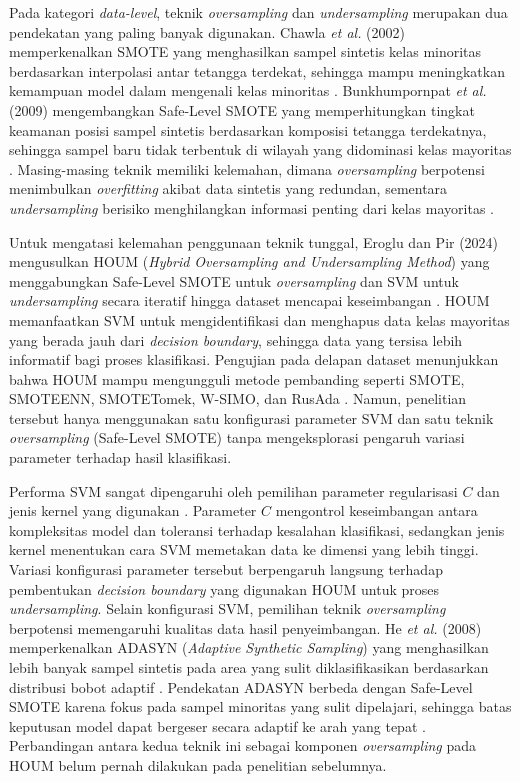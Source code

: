 Pada kategori \textit{data-level}, teknik \textit{oversampling} dan \textit{undersampling} merupakan dua pendekatan yang paling banyak digunakan. Chawla \textit{et al.} (2002) memperkenalkan SMOTE yang menghasilkan sampel sintetis kelas minoritas berdasarkan interpolasi antar tetangga terdekat, sehingga mampu meningkatkan kemampuan model dalam mengenali kelas minoritas \cite{Chawla2002SMOTE}. Bunkhumpornpat \textit{et al.} (2009) mengembangkan Safe-Level SMOTE yang memperhitungkan tingkat keamanan posisi sampel sintetis berdasarkan komposisi tetangga terdekatnya, sehingga sampel baru tidak terbentuk di wilayah yang didominasi kelas mayoritas \cite{Bunkhumpornpat2009SafeLevel}. Masing-masing teknik memiliki kelemahan, dimana \textit{oversampling} berpotensi menimbulkan \textit{overfitting} akibat data sintetis yang redundan, sementara \textit{undersampling} berisiko menghilangkan informasi penting dari kelas mayoritas \cite{Eroglu2024HOUM}.

Untuk mengatasi kelemahan penggunaan teknik tunggal, Eroglu dan Pir (2024) mengusulkan HOUM (\textit{Hybrid Oversampling and Undersampling Method}) yang menggabungkan Safe-Level SMOTE untuk \textit{oversampling} dan SVM untuk \textit{undersampling} secara iteratif hingga dataset mencapai keseimbangan \cite{Eroglu2024HOUM}. HOUM memanfaatkan SVM untuk mengidentifikasi dan menghapus data kelas mayoritas yang berada jauh dari \textit{decision boundary}, sehingga data yang tersisa lebih informatif bagi proses klasifikasi. Pengujian pada delapan dataset menunjukkan bahwa HOUM mampu mengungguli metode pembanding seperti SMOTE, SMOTEENN, SMOTETomek, W-SIMO, dan RusAda \cite{Eroglu2024HOUM}. Namun, penelitian tersebut hanya menggunakan satu konfigurasi parameter SVM dan satu teknik \textit{oversampling} (Safe-Level SMOTE) tanpa mengeksplorasi pengaruh variasi parameter terhadap hasil klasifikasi.

Performa SVM sangat dipengaruhi oleh pemilihan parameter regularisasi $C$ dan jenis kernel yang digunakan \cite{Cervantes2020SVM}. Parameter $C$ mengontrol keseimbangan antara kompleksitas model dan toleransi terhadap kesalahan klasifikasi, sedangkan jenis kernel menentukan cara SVM memetakan data ke dimensi yang lebih tinggi. Variasi konfigurasi parameter tersebut berpengaruh langsung terhadap pembentukan \textit{decision boundary} yang digunakan HOUM untuk proses \textit{undersampling}. Selain konfigurasi SVM, pemilihan teknik \textit{oversampling} berpotensi memengaruhi kualitas data hasil penyeimbangan. He \textit{et al.} (2008) memperkenalkan ADASYN (\textit{Adaptive Synthetic Sampling}) yang menghasilkan lebih banyak sampel sintetis pada area yang sulit diklasifikasikan berdasarkan distribusi bobot adaptif \cite{He2008ADASYN}. Pendekatan ADASYN berbeda dengan Safe-Level SMOTE karena fokus pada sampel minoritas yang sulit dipelajari, sehingga batas keputusan model dapat bergeser secara adaptif ke arah yang tepat \cite{He2008ADASYN}. Perbandingan antara kedua teknik ini sebagai komponen \textit{oversampling} pada HOUM belum pernah dilakukan pada penelitian sebelumnya.


